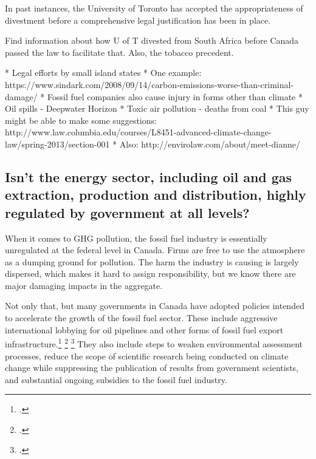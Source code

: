 In past instances, the University of Toronto has accepted the appropriateness of divestment before a comprehensive legal justification has been in place.


\begin{vcom}
Find information about how U of T divested from South Africa before Canada passed the law to facilitate that. Also, the tobacco precedent.
\end{vcom}


\begin{vcom}
* Legal efforts by small island states
* One example: https://www.sindark.com/2008/09/14/carbon-emissions-worse-than-criminal-damage/
* Fossil fuel companies also cause injury in forms other than climate
* Oil spills - Deepwater Horizon
* Toxic air pollution - deaths from coal
* This guy might be able to make some suggestions: http://www.law.columbia.edu/courses/L8451-advanced-climate-change-law/spring-2013/section-001
* Also: http://envirolaw.com/about/meet-dianne/
\end{vcom}
	
	
	
	\subsection{Isn't the energy sector, including oil and gas extraction, production and distribution, highly regulated by government at all levels?}
	\label{HeavilyRegulated}
	


When it comes to GHG pollution, the fossil fuel industry is essentially unregulated at the federal level in Canada.
Firms are free to use the atmosphere as a dumping ground for  pollution.
The harm the industry is causing is largely dispersed, which makes it hard to assign responsibility, but we know there are major damaging impacts in the aggregate.



Not only that, but many governments in Canada have adopted policies intended to accelerate the growth of the fossil fuel sector.
These include aggressive international lobbying for oil pipelines and other forms of fossil fuel export infrastructure.\footcite[See, for example: ][]{KeystoneLobbyingHarder} \footcite[][]{HarperNoBrainer} \footcite[][]{OliverRadicalLetter}
They also include steps to weaken environmental assessment processes, reduce the scope of scientific research being conducted on climate change while suppressing the publication of results from government scientists, and substantial ongoing subsidies to the fossil fuel industry.



